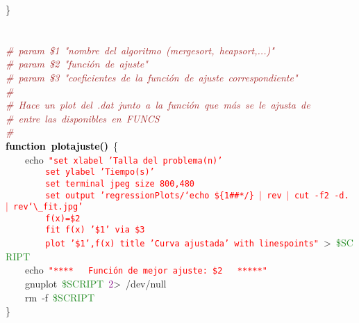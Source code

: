 \mbox{}\} \\
\mbox{} \\
\mbox{} \\
\mbox{}\textit{\textcolor{Brown}{\#\ param\ \$1\ "{}nombre\ del\ algoritmo\ (mergesort,\ heapsort,...)"{}}} \\
\mbox{}\textit{\textcolor{Brown}{\#\ param\ \$2\ "{}función\ de\ ajuste"{}}} \\
\mbox{}\textit{\textcolor{Brown}{\#\ param\ \$3\ "{}coeficientes\ de\ la\ función\ de\ ajuste\ correspondiente"{}}} \\
\mbox{}\textit{\textcolor{Brown}{\#}} \\
\mbox{}\textit{\textcolor{Brown}{\#\ Hace\ un\ plot\ del\ .dat\ junto\ a\ la\ función\ que\ más\ se\ le\ ajusta\ de}} \\
\mbox{}\textit{\textcolor{Brown}{\#\ entre\ las\ disponibles\ en\ FUNCS}} \\
\mbox{}\textit{\textcolor{Brown}{\#}} \\
\mbox{}\textbf{\textcolor{Black}{function\ plotajuste()}}\ \{ \\
\mbox{}\ \ \ \ echo\ \texttt{\textcolor{Red}{"{}set\ xlabel\ 'Talla\ del\ problema(n)'}} \\
\mbox{}\texttt{\textcolor{Red}{\ \ \ \ \ \ \ \ set\ ylabel\ 'Tiempo(s)'}} \\
\mbox{}\texttt{\textcolor{Red}{\ \ \ \ \ \ \ \ set\ terminal\ jpeg\ size\ 800,480}} \\
\mbox{}\texttt{\textcolor{Red}{\ \ \ \ \ \ \ \ set\ output\ 'regressionPlots/`echo\ \$\{1\#\#*/\}\ $|$\ rev\ $|$\ cut\ -f2\ -d.\ $|$\ rev`$\_$fit.jpg'}} \\
\mbox{}\texttt{\textcolor{Red}{\ \ \ \ \ \ \ \ f(x)=\$2}} \\
\mbox{}\texttt{\textcolor{Red}{\ \ \ \ \ \ \ \ fit\ f(x)\ '\$1'\ via\ \$3}} \\
\mbox{}\texttt{\textcolor{Red}{\ \ \ \ \ \ \ \ plot\ '\$1',f(x)\ title\ 'Curva\ ajustada'\ with\ linespoints"{}}}\ \textcolor{BrickRed}{\textgreater{}}\ \textcolor{ForestGreen}{\$SCRIPT} \\
\mbox{}\ \ \ \ echo\ \texttt{\textcolor{Red}{"{}****\ \ \ Función\ de\ mejor\ ajuste:\ \$2\ \ \ *****"{}}} \\
\mbox{}\ \ \ \ gnuplot\ \textcolor{ForestGreen}{\$SCRIPT}\ \textcolor{Purple}{2}\textcolor{BrickRed}{\textgreater{}}\ /dev/null \\
\mbox{}\ \ \ \ rm\ -f\ \textcolor{ForestGreen}{\$SCRIPT} \\
\mbox{}\} \\

